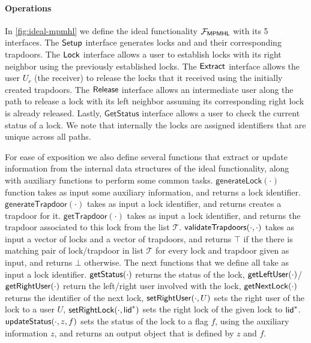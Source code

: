 \paragraph{Operations}
In \cref{fig:ideal-mpmhl} we define the ideal functionality $\mathcal{F}_{\mathsf{MPMHL}}$ with its 5 
interfaces. The $\mathsf{Setup}$ interface generates locks and and their corresponding trapdoors. 
The $\mathsf{Lock}$ interface allows a user to establish locks with its right neighbor using the 
previously established locks. The $\mathsf{Extract}$ interface allows the user $U_r$ (the receiver) to 
release the locks that it received using the initially created trapdoors. The $\mathsf{Release}$ 
interface allows an intermediate user along the path to release a lock with its left neighbor 
assuming its corresponding right lock is already released. Lastly, $\mathsf{GetStatus}$ interface 
allows a user to check the current status of a lock. We note that internally the locks are 
assigned identifiers that are unique across all paths.

For ease of exposition we also define several functions that extract or update information 
from the internal data structures of the ideal functionality, along with auxiliary functions 
to perform some common tasks. $\mathsf{generateLock}(\cdot)$ function takes as input some 
auxiliary information, and returns a lock identifier. $\mathsf{generateTrapdoor}(\cdot)$ takes 
as input a lock identifier, and returns creates a trapdoor for it. $\mathsf{getTrapdoor}(\cdot)$ 
takes as input a lock identifier, and returns the trapdoor associated to this lock from the list 
$\mathcal{T}$. $\mathsf{validateTrapdoors}(\cdot, \cdot)$ takes as input a vector of locks and a vector 
of trapdoors, and returns $\top$ if the there is matching pair of lock/trapdoor in list 
$\mathcal{T}$ for every lock and trapdoor given as input, and returns $\bot$ otherwise. The next functions that we define all take as input a lock identifier. $\mathsf{getStatus}(\cdot)$ returns the status of the lock, 
$\mathsf{getLeftUser}(\cdot)$/$\mathsf{getRightUser}(\cdot)$ return the left/right user involved with the 
lock, $\mathsf{getNextLock}(\cdot)$ returns the identifier of the next lock, $\mathsf{setRightUser}(\cdot, U)$ 
sets the right user of the lock to a user $U$, $\mathsf{setRightLock}(\cdot, \mathsf{lid}^*)$ sets the right lock 
of the given lock to $\mathsf{lid}^*$. $\mathsf{updateStatus}(\cdot, z, f)$ sets the status of the lock to a flag 
$f$, using the auxiliary information $z$, and returns an output object that is defined by $z$ 
and $f$.

